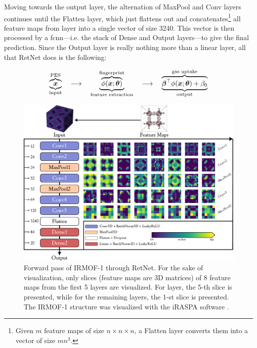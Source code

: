 Moving towards the output layer, the alternation of MaxPool and Conv layers
continues until the Flatten layer, which just flattens out
and concatenates\footnote{Given $m$ feature maps of size $n \times n \times n$,
a Flatten layer converts them into a vector of size $mn^3$.} all feature maps
from  layer into a single vector of size \num{3240}. This vector is then
processed by a \gls{fcnn}---i.e. the stack of Dense and
Output layers---to give the final prediction. Since the Output
layer is really nothing more than a linear
layer, all that RetNet does is the following:

\begin{equation}
	\label{eq:retnet}
	\underbrace{\overbrace{\boldsymbol{x}}^\text{PES}}_\text{input}
	\quad \longrightarrow \quad
	\underbrace{
		\overbrace{\phi(\boldsymbol{x};\boldsymbol{\theta})}
		^\text{fingerprint}
	}_\text{feature extraction}
	\quad \longrightarrow \quad
	\underbrace{
		\overbrace{\boldsymbol{\beta}^\top\phi(\boldsymbol{x};\boldsymbol{\theta}) + \beta_0}
		^\text{gas uptake}
	}_\text{output}
\end{equation}

\begin{figure}
	\centering
	\includegraphics[width=\textwidth]{fig/forward_pass.pdf}
	\caption[RetNet architecture.]{Forward pass of
	IRMOF-1 through RetNet. For the sake of
	visualization, only slices (feature maps are 3D matrices)
	of 8 feature maps from the first 5 layers are visualized. For 
	layer, the 5-th slice is presented, while for the remaining layers, the 1-st
	slice is presented. The IRMOF-1 structure was visualized with the iRASPA
	software \parencite{Dubbeldam2018}.}
	\label{fig:retnet}
\end{figure}

